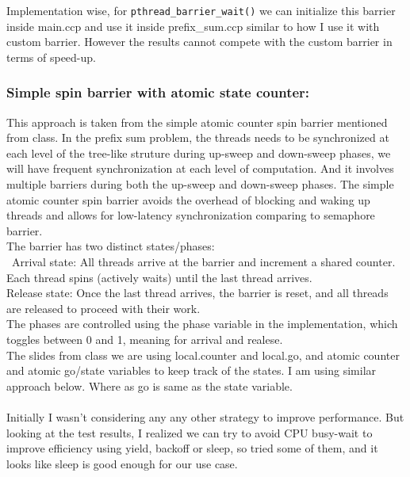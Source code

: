 \documentclass[letterpaper,12pt]{article}
\theoremstyle{remark}
\begin{document}
\medskip
\noindent Implementation wise, for \texttt{pthread\_barrier\_wait()} we can initialize this barrier inside main.ccp and use it inside prefix\_sum.ccp similar to how I use it with custom barrier. However the results cannot compete with the custom barrier in terms of speed-up.


\subsubsection {Simple spin barrier with atomic state counter:} 
This approach is taken from the simple atomic counter spin barrier mentioned from class. In the prefix sum problem, the threads needs to be synchronized at each level of the tree-like struture during up-sweep and down-sweep phases, we will have frequent synchronization at each level of computation. And it involves multiple barriers during both the up-sweep and down-sweep phases. The simple atomic counter spin barrier avoids the overhead of blocking and waking up threads and allows for low-latency synchronization comparing to semaphore barrier.\\
The barrier has two distinct states/phases:\\\
Arrival state: All threads arrive at the barrier and increment a shared counter. Each thread spins (actively waits) until the last thread arrives.\\
Release state: Once the last thread arrives, the barrier is reset, and all threads are released to proceed with their work.\\
The phases are controlled using the phase variable in the implementation, which toggles between 0 and 1, meaning for arrival and realese.\\
The slides from class we are using local.counter and local.go, and atomic counter and atomic go/state variables to keep track of the states.  I am using similar approach below. Where as go is same as the state variable. \\\\
Initially I wasn't considering any any other strategy to improve performance. But looking at the test results, I realized we can try to avoid CPU busy-wait to improve efficiency using yield, backoff or sleep, so tried some of them, and it looks like sleep is good enough for our use case.\\\\
\end{document}
